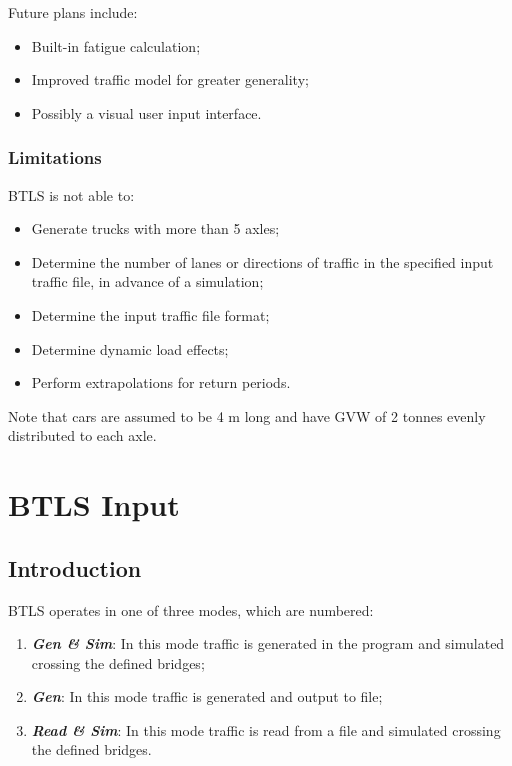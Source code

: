 \documentclass[
]{article}
\begin{document}
Future plans include:

\begin{itemize}
\item
  Built-in fatigue calculation;
\item
  Improved traffic model for greater generality;
\item
  Possibly a visual user input interface.
\end{itemize}

\subsubsection*{\texorpdfstring{\hfill\break
Limitations}{ Limitations}}\label{limitations}

BTLS is not able to:

\begin{itemize}
\item
  Generate trucks with more than 5 axles;
\item
  Determine the number of lanes or directions of traffic in the
  specified input traffic file, in advance of a simulation;
\item
  Determine the input traffic file format;
\item
  Determine dynamic load effects;
\item
  Perform extrapolations for return periods.
\end{itemize}

Note that cars are assumed to be 4 m long and have GVW of 2 tonnes
evenly distributed to each axle.

\section{BTLS Input}\label{btls-input}

\subsection{Introduction}\label{introduction-2}

BTLS operates in one of three modes, which are numbered:

\begin{enumerate}
\def\labelenumi{\arabic{enumi}.}
\item
  \emph{\textbf{Gen \& Sim}}: In this mode traffic is generated in the
  program and simulated crossing the defined bridges;
\item
  \emph{\textbf{Gen}}: In this mode traffic is generated and output to
  file;
\item
  \emph{\textbf{Read \& Sim}}: In this mode traffic is read from a file
  and simulated crossing the defined bridges.
\end{enumerate}
\end{document}

